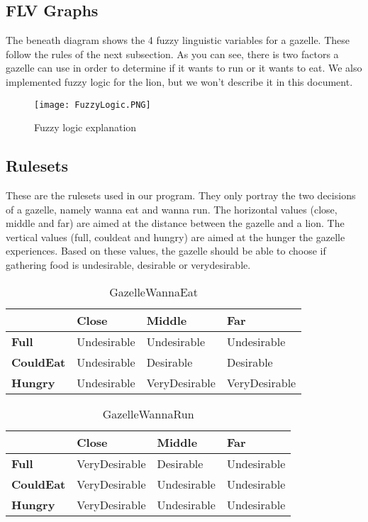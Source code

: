 \subsection{FLV Graphs}\label{subsec:flvGraphs}
The beneath diagram shows the 4 fuzzy linguistic variables for a gazelle.
These follow the rules of the next subsection.
As you can see, there is two factors a gazelle can use in order to determine if it wants to run or it wants to eat.
We also implemented fuzzy logic for the lion, but we won't describe it in this document.
\begin{figure}[ht]
    \begin{center}
        \texttt{[image: FuzzyLogic.PNG]}
    \end{center}
    \caption{Fuzzy logic explanation}
    \label{fig:FuzzyLogicExplanation}
\end{figure}
\subsection{Rulesets}
These are the rulesets used in our program.
They only portray the two decisions of a gazelle, namely wanna eat and wanna run.
The horizontal values (close, middle and far) are aimed at the distance between the gazelle and a lion.
The vertical values (full, couldeat and hungry) are aimed at the hunger the gazelle experiences.
Based on these values, the gazelle should be able to choose if gathering food is undesirable, desirable or verydesirable.
\begin{table}[ht]
    \centering
    \label{EatDesirability}
    \begin{tabular}{|l|l|l|l|}
        \hline
        & \textbf{Close}       & \textbf{Middle}        & \textbf{Far}           \\ \hline
        \textbf{Full}     & Undesirable & Undesirable   & Undesirable   \\ \hline
        \textbf{CouldEat} & Undesirable & Desirable     & Desirable     \\ \hline
        \textbf{Hungry}   & Undesirable & VeryDesirable & VeryDesirable \\ \hline
    \end{tabular}
    \caption{GazelleWannaEat}
\end{table}
\begin{table}[ht]
    \centering
    \label{|RunDesirability}
    \begin{tabular}{|l|l|l|l|}
        \hline
        & \textbf{Close}       & \textbf{Middle}        & \textbf{Far}           \\ \hline
        \textbf{Full}     & VeryDesirable & Desirable       & Undesirable     \\ \hline
        \textbf{CouldEat} & VeryDesirable & Undesirable     & Undesirable \\ \hline
        \textbf{Hungry}   & VeryDesirable & Undesirable     & Undesirable \\ \hline
    \end{tabular}
    \caption{GazelleWannaRun}
\end{table}
